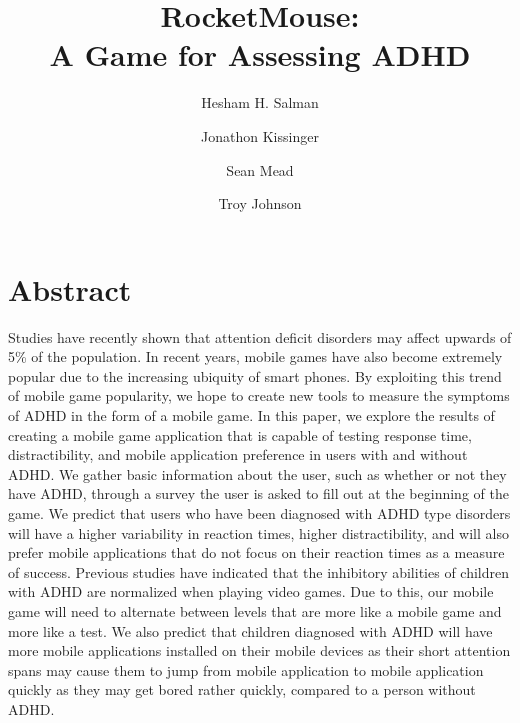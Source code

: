 \documentclass[a4wide]{article}
\title{RocketMouse:\\ A Game for Assessing ADHD}
\author{Hesham H. Salman \and Jonathon Kissinger \and Sean Mead \and Troy Johnson}
\begin{document}
\maketitle


\section{Abstract}
\- Studies have recently shown that attention deficit disorders may affect upwards of 5\% of the population. In recent years, mobile games have also become extremely popular due to the increasing ubiquity of smart phones. By exploiting this trend of mobile game popularity, we hope to create new tools to measure the symptoms of ADHD in the form of a mobile game. In this paper, we explore the results of creating a mobile game application that is capable of testing response time, distractibility, and mobile application preference in users with and without ADHD. We gather basic information about the user, such as whether or not they have ADHD, through a survey the user is asked to fill out at the beginning of the game. We predict that users who have been diagnosed with ADHD type disorders will have a higher variability in reaction times, higher distractibility, and will also prefer mobile applications that do not focus on their reaction times as a measure of success. Previous studies have indicated that the inhibitory abilities of children with ADHD are normalized when playing video games. Due to this, our mobile game will need to alternate between levels that are more like a mobile game and more like a test. We also predict that children diagnosed with ADHD will have more mobile applications installed on their mobile devices as their short attention spans may cause them to jump from mobile application to mobile application quickly as they may get bored rather quickly, compared to a person without ADHD.
\end{document}
